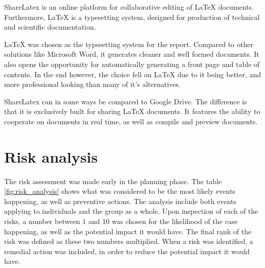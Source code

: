 ShareLatex \cite{sharelatex} is an online platform for collaborative editing of LaTeX documents. Furthermore, LaTeX is a typesetting system, designed for production of technical and scientific documentation.

LaTeX was chosen as the typesetting system for the report. Compared to other solutions like Microsoft Word, it generates cleaner and well formed documents. It also opens the opportunity for automatically generating a front page and table of contents. In the end however, the choice fell on LaTeX due to it being better, and more professional looking than many of it's alternatives.

ShareLatex can in some ways be compared to Google Drive. The difference is that it is exclusively built for sharing LaTeX documents. It features the ability to cooperate on documents in real time, as well as compile and preview documents.

\section{Risk analysis}
\label{sec:prestudies-risk_analysis}

The risk assessment was made early in the planning phase. The table \ref{fig:risk_analysis} shows what was considered to be the most likely events happening, as well as preventive actions. The analysis include both events applying to individuals and the group as a whole. Upon inspection of each of the risks, a number between 1 and 10 was chosen for the likelihood of the case happening, as well as the potential impact it would have. The final rank of the risk was defined as these two numbers multiplied. When a risk was identified, a remedial action was included, in order to reduce the potential impact it would have.

